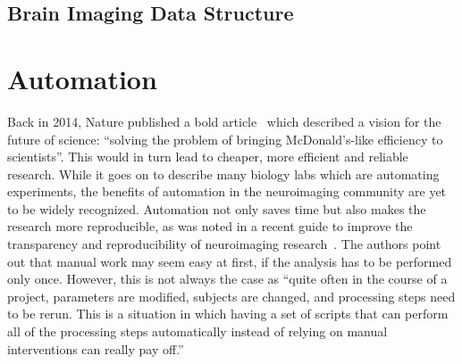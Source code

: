 \subsection{Brain Imaging Data Structure}

\clearpage
\section{Automation}
Back in 2014, Nature published a bold article~\citep{hayden2014automated} which described a vision for the future of science: ``solving the problem of bringing McDonald's-like efficiency to scientists''. This would in turn lead to cheaper, more efficient and reliable research. While it goes on to describe many biology labs which are automating experiments, the benefits of automation in the neuroimaging community are yet to be widely recognized. Automation not only saves time but also makes the research more reproducible, as was noted in a recent guide to improve the transparency and reproducibility of neuroimaging research~\citep{gorgolewski2016practical}. The authors point out that manual work may seem easy at first, if the analysis has to be performed only once. However, this is not always the case as ``quite often in the course of a project, parameters are modified, subjects are changed, and processing steps need to be rerun. This is a situation in which having a set of scripts that can perform all of the processing steps automatically instead of relying on manual interventions can really pay off.''

